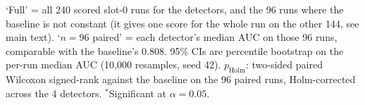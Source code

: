 \begin{table}[pos=t]
\centering
\caption{Component 5: detector AUC-ROC vs the static-threshold baseline (slot-0 runs: scenarios P1, P2, P3, N1)}
\label{tab:component5}
\small
{}
\par\vspace{2mm}
\noindent\begin{minipage}{\linewidth}\raggedright\footnotesize `Full' = all 240 scored slot-0 runs for the detectors, and the 96 runs where the baseline is not constant (it gives one score for the whole run on the other 144, see main text). `$n=96$ paired' = each detector's median AUC on those 96 runs, comparable with the baseline's 0.808. 95\% CIs are percentile bootstrap on the per-run median AUC (10{,}000 resamples, seed 42). $p_{\mathrm{Holm}}$: two-sided paired Wilcoxon signed-rank against the baseline on the 96 paired runs, Holm-corrected across the 4 detectors. $^*$Significant at $\alpha=0.05$.\end{minipage}
\end{table}